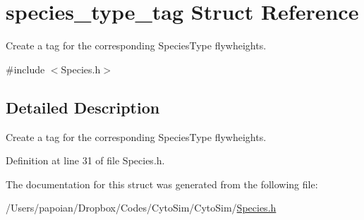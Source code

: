 \hypertarget{structspecies__type__tag}{\section{species\-\_\-type\-\_\-tag Struct Reference}
\label{structspecies__type__tag}
}


Create a tag for the corresponding Species\-Type flywheights.  




{\ttfamily \#include $<$Species.\-h$>$}



\subsection{Detailed Description}
Create a tag for the corresponding Species\-Type flywheights. 

Definition at line 31 of file Species.\-h.



The documentation for this struct was generated from the following file\-:\begin{DoxyCompactItemize}
\item 
/\-Users/papoian/\-Dropbox/\-Codes/\-Cyto\-Sim/\-Cyto\-Sim/\hyperlink{Species_8h}{Species.\-h}\end{DoxyCompactItemize}
